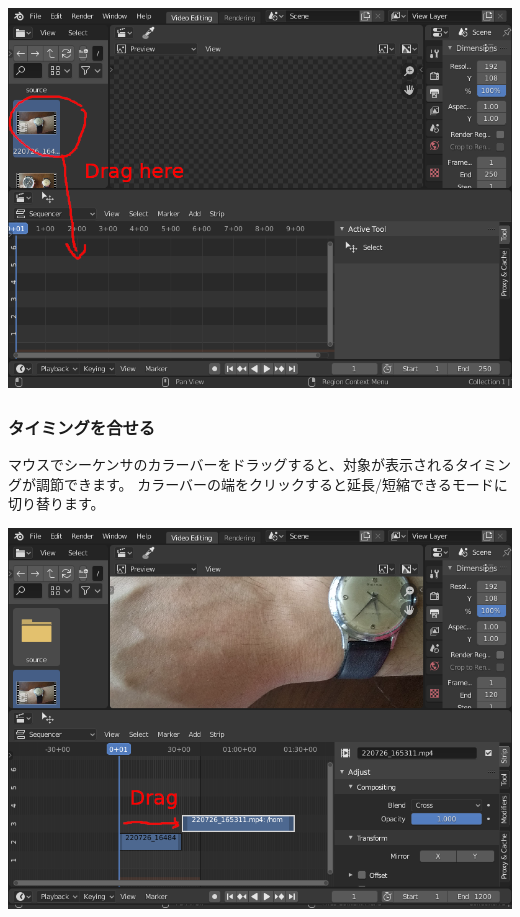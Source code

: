 \documentclass[mingoth,a4paper]{jsarticle}
\begin{document}
\begin{center}
\includegraphics[scale=0.3]{image202209/blender_import.png}
\end{center}

\subsubsection{タイミングを合せる}

マウスでシーケンサのカラーバーをドラッグすると、対象が表示されるタイミングが調節できます。
カラーバーの端をクリックすると延長/短縮できるモードに切り替ります。

\begin{center}
\includegraphics[scale=0.3]{image202209/blender_change_start_frame.png}
\end{center}
\end{document}
